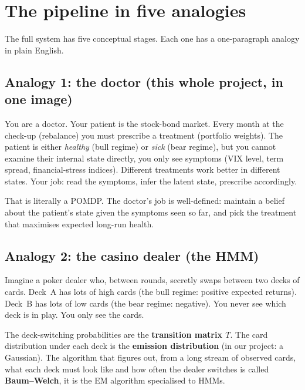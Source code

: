 \documentclass[11pt]{article}
\begin{document}
\section{The pipeline in five analogies}

The full system has five conceptual stages. Each one has a one-paragraph analogy in plain English.

\subsection{Analogy 1: the doctor (this whole project, in one image)}

\begin{analogy}
You are a doctor. Your patient is the stock-bond market. Every month at the check-up (rebalance) you must prescribe a treatment (portfolio weights). The patient is either \emph{healthy} (bull regime) or \emph{sick} (bear regime), but you cannot examine their internal state directly, you only see symptoms (VIX level, term spread, financial-stress indices). Different treatments work better in different states. Your job: read the symptoms, infer the latent state, prescribe accordingly.
\end{analogy}

That is literally a POMDP. The doctor's job is well-defined: maintain a belief about the patient's state given the symptoms seen so far, and pick the treatment that maximises expected long-run health.

\subsection{Analogy 2: the casino dealer (the HMM)}

\begin{analogy}
Imagine a poker dealer who, between rounds, secretly swaps between two decks of cards. Deck~A has lots of high cards (the bull regime: positive expected returns). Deck~B has lots of low cards (the bear regime: negative). You never see which deck is in play. You only see the cards.
\end{analogy}

The deck-switching probabilities are the \textbf{transition matrix $T$}. The card distribution under each deck is the \textbf{emission distribution} (in our project: a Gaussian). The algorithm that figures out, from a long stream of observed cards, what each deck must look like and how often the dealer switches is called \textbf{Baum--Welch}, it is the EM algorithm specialised to HMMs.
\end{document}
